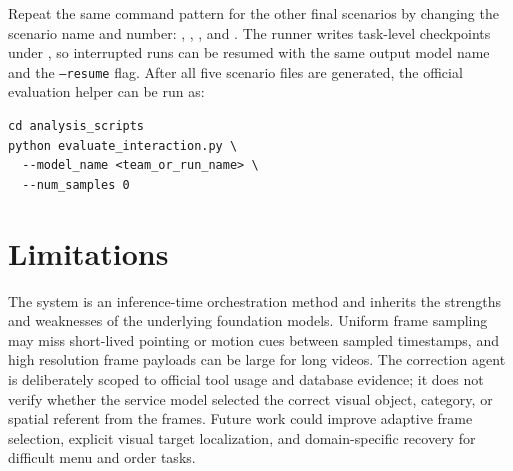 \documentclass[sigconf,nonacm]{acmart}
\begin{document}
Repeat the same command pattern for the other final scenarios by changing the
scenario name and number: , ,
, and . The runner writes task-level checkpoints
under , so interrupted runs can be resumed
with the same output model name and the \texttt{--resume} flag. After all five
scenario files are generated, the official evaluation helper can be run as:

\begin{verbatim}
cd analysis_scripts
python evaluate_interaction.py \
  --model_name <team_or_run_name> \
  --num_samples 0
\end{verbatim}

\section{Limitations}

The system is an inference-time orchestration method and inherits the strengths
and weaknesses of the underlying foundation models. Uniform frame sampling may
miss short-lived pointing or motion cues between sampled timestamps, and high
resolution frame payloads can be large for long videos. The correction agent is
deliberately scoped to official tool usage and database evidence; it does not
verify whether the service model selected the correct visual object, category,
or spatial referent from the frames. Future work could improve adaptive frame
selection, explicit visual target localization, and domain-specific recovery
for difficult menu and order tasks.



\end{document}
